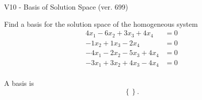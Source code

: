 \begin{exercise}
  \begin{exerciseTitle}V10 - Basis of Solution Space (ver. 699)\end{exerciseTitle}
  \begin{exerciseStatement}
    Find a basis for the solution space of the homogeneous system 
\begin{align*}
 4 x_ 1 -6 x_ 2 + 3 x_ 3 + 4 x_ 4 &= 0  \\ 
  -1 x_ 2 + 1 x_ 3 -2 x_ 4 &= 0  \\ 
  -4 x_ 1 -2 x_ 2 -5 x_ 3 + 4 x_ 4 &= 0  \\ 
  -3 x_ 1 + 3 x_ 2 + 4 x_ 3 -4 x_ 4 &= 0  \\ 
 \end{align*}


 
  \end{exerciseStatement}

  \begin{exerciseAnswer}
   A basis is   
\[\left\{\right\}.\]

  


  \end{exerciseAnswer}
\end{exercise}